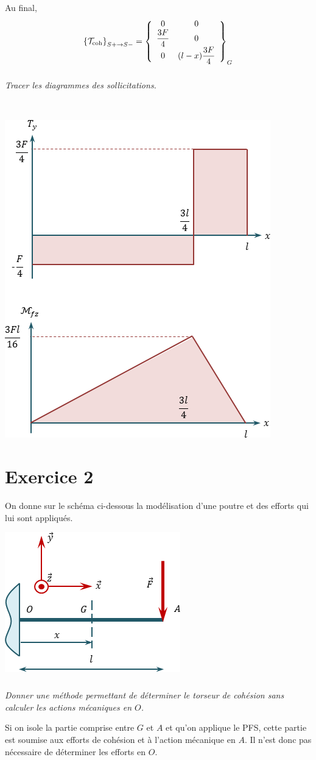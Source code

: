 \documentclass[10pt,fleqn]{article} %
\begin{document}
\begin{multicols}{2}
\begin{corrige}
Au final,
$$\torseurscoh_{S+\rightarrow S-}
=\torseurcol{0}{\dfrac{3F}{4}}{0}{0}{0}{ (l-x) \dfrac{3F}{4}}{G}
$$
\end{corrige}
\else 
\fi

\subparagraph{}
\textit{Tracer les diagrammes des sollicitations.}
\ifprof
\begin{corrige}~\\

\begin{center}
\includegraphics[width=.5\textwidth]{images/exo_01_corr}
\end{center}
\end{corrige}
\else 
\fi



\section*{Exercice 2}
\setcounter{subparagraph}{0}
On donne sur le schéma ci-dessous la modélisation d'une poutre et des efforts qui lui sont appliqués.
\begin{center}
\includegraphics[width=.45\textwidth]{images/exo_01_01}
\end{center}

\subparagraph{}
\textit{Donner une méthode permettant de déterminer le torseur de cohésion sans calculer les actions mécaniques en $O$.}
\ifprof
\begin{corrige} Si on isole la partie comprise entre $G$ et $A$ et qu'on applique le PFS, cette partie est soumise aux efforts de cohésion et à l'action mécanique en $A$. Il n'est donc pas nécessaire de déterminer les efforts en $O$.
\end{corrige}
\else
\fi


\end{multicols}
\end{document}
